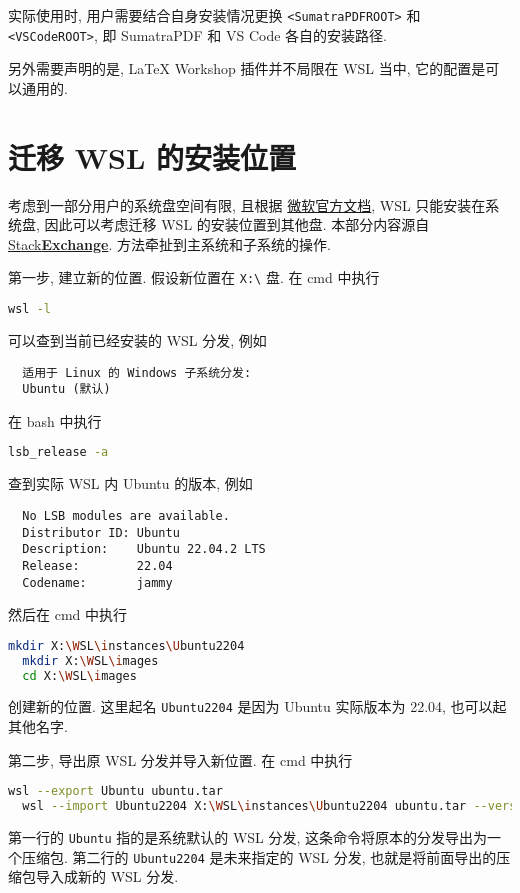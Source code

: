 实际使用时,
用户需要结合自身安装情况更换 \texttt{<SumatraPDFROOT>} 和 \texttt{<VSCodeROOT>},
即 SumatraPDF 和 VS Code 各自的安装路径.

另外需要声明的是,
\LaTeX{} Workshop 插件并不局限在 WSL 当中,
它的配置是可以通用的.

\section{迁移 WSL 的安装位置}

考虑到一部分用户的系统盘空间有限,
且根据%
\href{https://learn.microsoft.com/zh-cn/windows/wsl/troubleshooting?source=recommendations#installation-issues}{微软官方文档},
WSL 只能安装在系统盘,
因此可以考虑迁移 WSL 的安装位置到其他盘.
本部分内容源自
\href{https://superuser.com/questions/1701175/installing-ubuntu-on-mnt-d-with-wsl}{\textsf{Stack\textbf{Exchange}}}.
方法牵扯到主系统和子系统的操作.

第一步,
建立新的位置.
假设新位置在 \texttt{X:\textbackslash} 盘.
在 \textsf{cmd} 中执行
\begin{lstlisting}[language=bash]
  wsl -l
\end{lstlisting}
可以查到当前已经安装的 WSL 分发,
例如
\begin{lstlisting}
  适用于 Linux 的 Windows 子系统分发:
  Ubuntu (默认)
\end{lstlisting}
在 \textsf{bash} 中执行
\begin{lstlisting}[language=bash]
  lsb_release -a
\end{lstlisting}
查到实际 WSL 内 Ubuntu 的版本,
例如
\begin{lstlisting}
  No LSB modules are available.
  Distributor ID: Ubuntu
  Description:    Ubuntu 22.04.2 LTS
  Release:        22.04
  Codename:       jammy
\end{lstlisting}
然后在 \textsf{cmd} 中执行
\begin{lstlisting}[language=bash]
  mkdir X:\WSL\instances\Ubuntu2204
  mkdir X:\WSL\images
  cd X:\WSL\images
\end{lstlisting}
创建新的位置.
这里起名 \texttt{Ubuntu2204} 是因为 Ubuntu 实际版本为 22.04,
也可以起其他名字.

第二步,
导出原 WSL 分发并导入新位置.
在 \textsf{cmd} 中执行
\begin{lstlisting}[language=bash]
  wsl --export Ubuntu ubuntu.tar
  wsl --import Ubuntu2204 X:\WSL\instances\Ubuntu2204 ubuntu.tar --version 2
\end{lstlisting}
第一行的 \texttt{Ubuntu} 指的是系统默认的 WSL 分发,
这条命令将原本的分发导出为一个压缩包.
第二行的 \texttt{Ubuntu2204} 是未来指定的 WSL 分发,
也就是将前面导出的压缩包导入成新的 WSL 分发.

